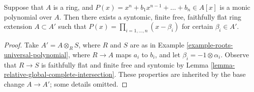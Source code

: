 \begin{lemma}
\label{lemma-adjoin-roots}
Suppose that $A$ is a ring, and
$P(x) = x^n + b_1 x^{n-1} + \ldots + b_n \in A[x]$ is
a monic polynomial over $A$. Then there exists a
syntomic, finite free, faithfully flat ring extension
$A \subset A'$ such that $P(x) = \prod_{i = 1, \ldots, n} (x - \beta_i)$
for certain $\beta_i \in A'$.
\end{lemma}

\begin{proof}
Take $A' = A \otimes_R S$, where $R$ and $S$ are as in
Example \ref{example-roots-universal-polynomial},
where $R \to A$ maps $a_i$ to $b_i$, and let
$\beta_i = -1 \otimes \alpha_i$. Observe that $R \to S$ is
faithfully flat and finite free and syntomic by
Lemma \ref{lemma-relative-global-complete-intersection}.
These properties are inherited by the base change
$A \to A'$; some details omitted.
\end{proof}
